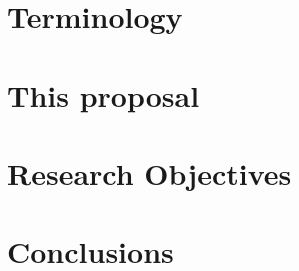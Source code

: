 \documentclass[10pt,twocolumn]{article}
\author{Tome Levy\\
	Department of Computer Science\\
	Technion---Israel Institute of Technology\\
	\texttt{\small \href{mailto:liorsam@campus.Technion.ac.il}{liorsam@campus.Technion.ac.il}}}
\date{\small Advisor: Prof.\ Yossi Gil}
\begin{document}
\maketitle
  
\begin{abstract}
	 
\end{abstract}

\section{Terminology}


\section{This proposal}
\label{Section:proposal}


\section{Research Objectives}
\label{Section:objectives}
%

\section{Conclusions}
\label{Section:zz}



%

\end{document}
